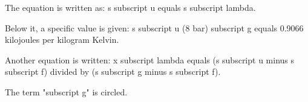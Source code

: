 The equation is written as:  
s subscript u equals s subscript lambda.  

Below it, a specific value is given:  
s subscript u (8 bar) subscript g equals 0.9066 kilojoules per kilogram Kelvin.  

Another equation is written:  
x subscript lambda equals (s subscript u minus s subscript f) divided by (s subscript g minus s subscript f).  

The term "subscript g" is circled.